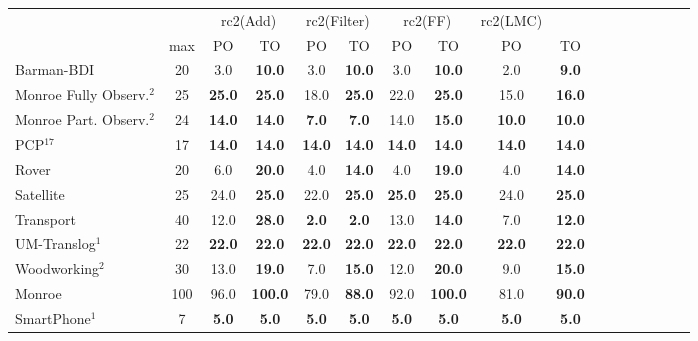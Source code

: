 \documentclass[letterpaper]{article} %
\begin{document}
\begin{table*}[h]
	\centering
	\scalebox{1} {
	\begin{tabular}{lccccccccccccccccl} 
	\toprule 
	&& \multicolumn{2}{c}{rc2(Add)} & \multicolumn{2}{c}{rc2(Filter)} & \multicolumn{2}{c}{rc2(FF)} & \multicolumn{2}{c}{rc2(LMC)} \\ 
	\cmidrule(lr){3-4} \cmidrule(lr){5-6} \cmidrule(lr){7-8} \cmidrule(lr){9-10}  
	& max &PO & TO & PO & TO & PO & TO & PO &\multicolumn{2}{c}{ TO  } \\ 
	\midrule 
	Barman-BDI & 20 & 3.0 & \textbf{10.0} & 3.0 & \textbf{10.0} & 3.0 & \textbf{10.0} & 2.0 &\multicolumn{2}{c}{ \textbf{9.0}  } \\ 
	Monroe Fully Observ.$^{2}$ & 25 & \textbf{25.0} & \textbf{25.0} & 18.0 & \textbf{25.0} & 22.0 & \textbf{25.0} & 15.0 &\multicolumn{2}{c}{ \textbf{16.0}  } \\ 
	Monroe Part. Observ.$^{2}$ & 24 & \textbf{14.0} & \textbf{14.0} & \textbf{7.0} & \textbf{7.0} & 14.0 & \textbf{15.0} & \textbf{10.0} &\multicolumn{2}{c}{ \textbf{10.0}  } \\ 
	PCP$^{17}$ & 17 & \textbf{14.0} & \textbf{14.0} & \textbf{14.0} & \textbf{14.0} & \textbf{14.0} & \textbf{14.0} & \textbf{14.0} &\multicolumn{2}{c}{ \textbf{14.0}  } \\ 
	Rover & 20 & 6.0 & \textbf{20.0} & 4.0 & \textbf{14.0} & 4.0 & \textbf{19.0} & 4.0 &\multicolumn{2}{c}{ \textbf{14.0}  } \\ 
	Satellite & 25 & 24.0 & \textbf{25.0} & 22.0 & \textbf{25.0} & \textbf{25.0} & \textbf{25.0} & 24.0 &\multicolumn{2}{c}{ \textbf{25.0}  } \\  
	Transport & 40 & 12.0 & \textbf{28.0} & \textbf{2.0} & \textbf{2.0} & 13.0 & \textbf{14.0} & 7.0 &\multicolumn{2}{c}{ \textbf{12.0}  } \\ 
	UM-Translog$^{1}$ & 22 & \textbf{22.0} & \textbf{22.0} & \textbf{22.0} & \textbf{22.0} & \textbf{22.0} & \textbf{22.0} & \textbf{22.0} &\multicolumn{2}{c}{ \textbf{22.0}  } \\ 
	Woodworking$^{2}$ & 30 & 13.0 & \textbf{19.0} & 7.0 & \textbf{15.0} & 12.0 & \textbf{20.0} & 9.0 &\multicolumn{2}{c}{ \textbf{15.0}  } \\ 
	\midrule 
	Monroe & 100 & 96.0 & \textbf{100.0} & 79.0 & \textbf{88.0} & 92.0 & \textbf{100.0} & 81.0 &\multicolumn{2}{c}{ \textbf{90.0}  } \\ 
	SmartPhone$^{1}$ & 7 & \textbf{5.0} & \textbf{5.0} & \textbf{5.0} & \textbf{5.0} & \textbf{5.0} & \textbf{5.0} & \textbf{5.0} &\multicolumn{2}{c}{ \textbf{5.0}  } \\ 

\end{tabular}}
\end{table*}
\end{document}
